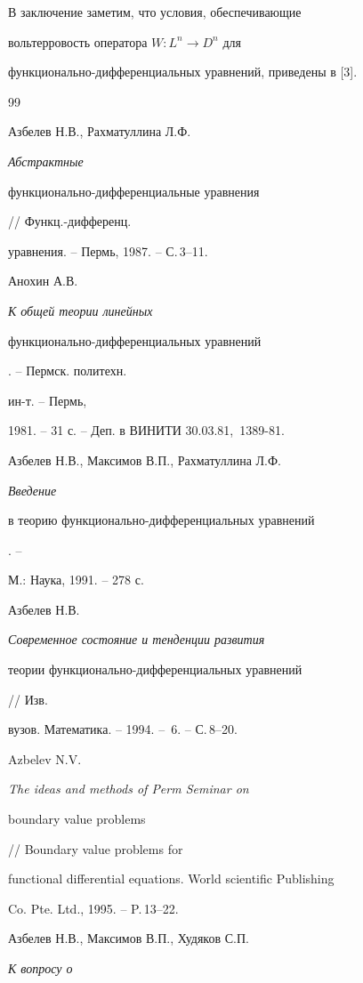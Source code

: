  


В заключение заметим, что условия, обеспечивающие 


вольтерровость оператора $W:L^n\to D^n$ для  


функционально-дифференциальных уравнений, приведены в [3]. 


 


\begin{thebibliography}{99} 


 




Азбелев Н.В., Рахматуллина Л.Ф. {\em Абстрактные  


функционально-дифференциальные уравнения} // Функц.-дифференц.  


уравнения. -- Пермь, 1987. -- С.\,3--11.  




Анохин А.В. {\em К общей теории линейных  


функционально-дифференциальных уравнений}. -- Пермск. политехн. 


ин-т. -- Пермь,  


1981. -- 31 с. -- Деп. в ВИНИТИ 30.03.81, \No\,1389-81. 




Азбелев Н.В., Максимов В.П., Рахматуллина Л.Ф. {\em Введение  


в теорию функционально-дифференциальных уравнений}. -- 


М.: Наука, 1991. -- 278 с. 




Азбелев Н.В. {\em Современное состояние и тенденции развития  


теории функционально-дифференциальных уравнений} // Изв. 


вузов. Математика. -- 1994. -- \No\,6. -- С.\,8--20. 




Azbelev N.V. {\em The ideas and methods of Perm Seminar on  


boundary value problems} // Boundary value problems for  


functional differential equations. World scientific Publishing  


Co. Pte. Ltd., 1995. -- P.\,13--22. 




Азбелев Н.В., Максимов В.П., Худяков С.П. {\em К вопросу о  


}
\end{thebibliography}
